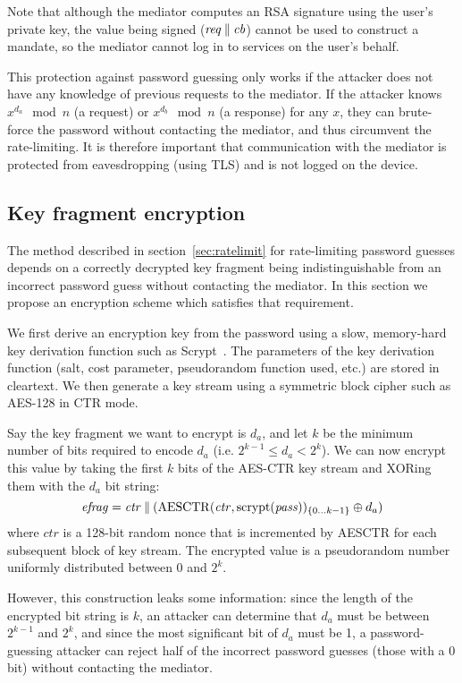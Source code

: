 Note that although the mediator computes an RSA signature using the user's private key, the value
being signed ($\mathit{req} \mathbin{\|} \mathit{cb}$) cannot be used to construct a mandate, so the
mediator cannot log in to services on the user's behalf.

This protection against password guessing only works if the attacker does not have any knowledge of
previous requests to the mediator. If the attacker knows $x^{d_a} \mod n$ (a request) or
$x^{d_b} \mod n$ (a response) for any $x$, they can brute-force the password without contacting the
mediator, and thus circumvent the rate-limiting.  It is therefore important that communication with
the mediator is protected from eavesdropping (using TLS) and is not logged on the device.

\subsection{Key fragment encryption}\label{sec:fragmentenc}

The method described in section~\ref{sec:ratelimit} for rate-limiting password guesses depends on a
correctly decrypted key fragment being indistinguishable from an incorrect password guess without
contacting the mediator. In this section we propose an encryption scheme which satisfies that
requirement.

We first derive an encryption key from the password using a slow, memory-hard key derivation
function such as Scrypt~\cite{Percival09}. The parameters of the key derivation function (salt, cost
parameter, pseudorandom function used, etc.) are stored in cleartext. We then generate a key stream
using a symmetric block cipher such as AES-128 in CTR mode.~\cite{Lipmaa00}

Say the key fragment we want to encrypt is $d_a$, and let $k$ be the minimum number of bits required
to encode $d_a$ (i.e. $2^{k-1} \le d_a < 2^k$). We can now encrypt this value by taking the first
$k$ bits of the AES-CTR key stream and XORing them with the $d_a$ bit string:
$$\mathit{efrag} = \mathit{ctr} \mathbin{\|}
    (\mathrm{AESCTR}(\mathit{ctr}, \mathrm{scrypt}(\mathit{pass}))_{\{0 \dots k-1\}} \oplus d_a)$$
where $\mathit{ctr}$ is a 128-bit random nonce that is incremented by AESCTR for each subsequent
block of key stream. The encrypted value is a pseudorandom number uniformly distributed between 0
and $2^k$.

However, this construction leaks some information: since the length of the encrypted bit string is
$k$, an attacker can determine that $d_a$ must be between $2^{k-1}$ and $2^k$, and since the most
significant bit of $d_a$ must be 1, a password-guessing attacker can reject half of the incorrect
password guesses (those with a 0 bit) without contacting the mediator.

